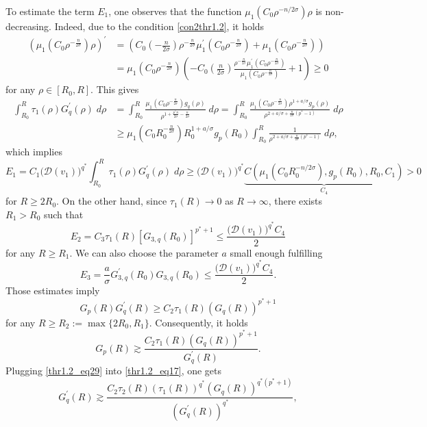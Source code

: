 \documentclass[11pt,reqno]{amsart}
\newcommand{\tron}[1]{\left( #1 \right)}
\numberwithin{equation}{section}
\begin{document}
To estimate the term $E_1$, one observes that the function $\mu_1\tron{C_0\rho^{-n/2\sigma}}\rho$ is non-decreasing. Indeed, due to the condition \ref{con2thr1.2}, it holds
\[
\begin{aligned}
    \tron{\mu_1\tron{C_0\rho^{-\frac{n}{2\sigma}}}\rho}^{\prime}&=\tron{C_0\tron{-\frac{n}{2\sigma}}\rho^{-\frac{n}{2\sigma}}\mu^{\prime}_1\tron{C_0\rho^{-\frac{n}{2\sigma}}}+\mu_1\tron{C_0\rho^{-\frac{n}{2\sigma}}}}\\
    &=\mu_1\tron{C_0\rho^{-\frac{n}{2\sigma}}}\tron{-C_0\tron{\frac{n}{2\sigma}}\frac{\rho^{-\frac{n}{2\sigma}}\mu^{\prime}_1\tron{C_0\rho^{-\frac{n}{2\sigma}}}}{\mu_1\tron{C_0\rho^{-\frac{n}{2\sigma}}}}+1}\geq 0
\end{aligned}
\]
for any $\rho\in [R_0,R]$. This gives
\begin{align}
\int_{R_0}^{R}\tau_1(\rho)G^{\prime}_q(\rho)\;d\rho&=\int_{R_0}^{R}\frac{\mu_1\tron{C_0\rho^{-\frac{n}{2\sigma}}}g_q(\rho)}{\rho^{1+\frac{p^*n}{2\sigma}-\frac{n}{2\sigma}}}\;d\rho=\int_{R_0}^{R}\frac{\mu_1\tron{C_0\rho^{-\frac{n}{2\sigma}}}\rho^{1+a/\sigma}g_p(\rho)}{\rho^{2+a/\sigma+\frac{n}{2\sigma}(p^*-1)}}\;d\rho \nonumber \\
&\geq \mu_1\tron{C_0R_0^{-\frac{n}{2\sigma}}}R_0^{1+a/\sigma}g_p(R_0)\int_{R_0}^{R}\frac{1}{\rho^{2+a/\sigma+\frac{n}{2\sigma}(p^*-1)}}\;d\rho, \label{thr1.2_eq28}
\end{align}
which implies
\[
E_1=C_1\big(\mathcal{D}(v_1)\big)^{q^*}\int_{R_0}^{R}\tau_1(\rho)G^{\prime}_q(\rho)\;d\rho\geq \big(\mathcal{D}(v_1)\big)^{q^*}\underbrace{C\tron{\mu_1\tron{C_0R_0^{-n/2\sigma}},g_p(R_0),R_0,C_1}}_{C_4}>0
\]
for $R\geq 2R_0$. On the other hand, since $\tau_1(R)\to 0$ as $R\to \infty$, there exists $R_1>R_0$ such that
\[
E_2=C_3\tau_1(R)[G_{3,q}(R_0)]^{p^*+1}\leq \frac{\big(\mathcal{D}(v_1)\big)^{q^*}C_4}{2}
\]
for any $R\geq R_1$. We can also choose the parameter $a$ small enough fulfilling
\[
E_3= \frac{a}{\sigma}G^{\prime}_{3,q}(R_0)G_{3,q}(R_0)\leq \frac{\big(\mathcal{D}(v_1)\big)^{q^*}C_4}{2}.
\]
Those estimates imply 
\[
G_p(R) G_q^{\prime}(R) \geq C_2 \tau_1(R)\left(G_q(R)\right)^{p^*+1}
\]
for any $R\geq R_2:=\max\{2R_0,R_1\}$. Consequently, it holds
\begin{equation}\label{thr1.2_eq29}
G_p(R) \gtrsim \frac{C_2 \tau_1(R)\left(G_q(R)\right)^{p^*+1}}{G_q^{\prime}(R)}.
\end{equation}
Plugging \eqref{thr1.2_eq29} into \eqref{thr1.2_eq17}, one gets
$$
G_q^{\prime}(R) \gtrsim \frac{C_2 \tau_2(R)\left(\tau_1(R)\right)^{q^*}\left(G_q(R)\right)^{q^*\left(p^*+1\right)}}{\left(G_q^{\prime}(R)\right)^{q^*}},
$$
\end{document}
